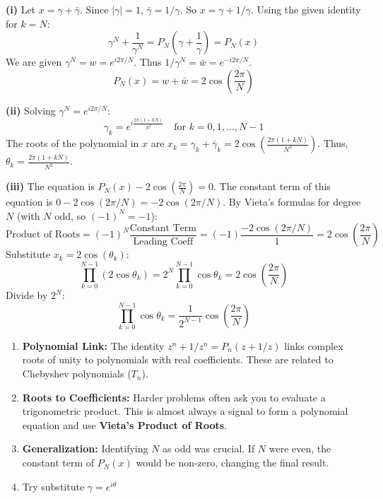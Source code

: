 \begin{solution}
\textbf{(i)}
Let $x = \gamma + \bar{\gamma}$. Since $|\gamma|=1$, $\bar{\gamma} = 1/\gamma$. So $x = \gamma + 1/\gamma$.
Using the given identity for $k=N$:
\[ \gamma^N + \frac{1}{\gamma^N} = P_N\left(\gamma + \frac{1}{\gamma}\right) = P_N(x) \]
We are given $\gamma^N = w = e^{i 2\pi/N}$. Thus $1/\gamma^N = \bar{w} = e^{-i 2\pi/N}$.
\[ P_N(x) = w + \bar{w} = 2\cos\left(\frac{2\pi}{N}\right) \]

\textbf{(ii)}
Solving $\gamma^N = e^{i 2\pi/N}$:
\[ \gamma_k = e^{i \frac{2\pi(1+kN)}{N^2}} \quad \text{for } k = 0, 1, \dots, N-1 \]
The roots of the polynomial in $x$ are $x_k = \gamma_k + \bar{\gamma}_k = 2\cos\left( \frac{2\pi(1+kN)}{N^2} \right)$.
Thus, $\theta_k = \frac{2\pi(1+kN)}{N^2}$.

\textbf{(iii)}
The equation is $P_N(x) - 2\cos\left(\frac{2\pi}{N}\right) = 0$.
The constant term of this equation is $0 - 2\cos(2\pi/N) = -2\cos(2\pi/N)$.
By Vieta's formulas for degree $N$ (with $N$ odd, so $(-1)^N = -1$):
\[ \text{Product of Roots} = (-1)^N \frac{\text{Constant Term}}{\text{Leading Coeff}} = (-1) \frac{-2\cos(2\pi/N)}{1} = 2\cos\left(\frac{2\pi}{N}\right) \]
Substitute $x_k = 2\cos(\theta_k)$:
\[ \prod_{k=0}^{N-1} (2\cos\theta_k) = 2^N \prod_{k=0}^{N-1} \cos\theta_k = 2\cos\left(\frac{2\pi}{N}\right) \]
Divide by $2^N$:
\[ \prod_{k=0}^{N-1} \cos\theta_k = \frac{1}{2^{N-1}} \cos\left(\frac{2\pi}{N}\right) \]
\end{solution}

\begin{takeaways}
\begin{enumerate}
    \item \textbf{Polynomial Link:} The identity $z^n + 1/z^n = P_n(z+1/z)$ links complex roots of unity to polynomials with real coefficients. These are related to Chebyshev polynomials ($T_n$).
    \item \textbf{Roots to Coefficients:} Harder problems often ask you to evaluate a trigonometric product. This is almost always a signal to form a polynomial equation and use \textbf{Vieta's Product of Roots}.
    \item \textbf{Generalization:} Identifying $N$ as odd was crucial. If $N$ were even, the constant term of $P_N(x)$ would be non-zero, changing the final result.
    \item Try substitute $ \gamma = e^{i\theta}$

\end{enumerate}
\end{takeaways}

